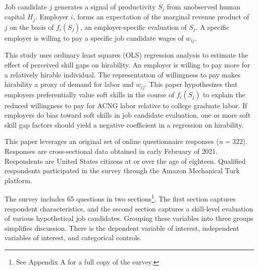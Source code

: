 Job candidate $j$ generates a signal of productivity $S_j$ from unobserved human capital $H_j$.
Employer $i$, forms an expectation of the marginal revenue product of $j$ on the basis of $f_i(S_j)$, an employer-specific evaluation of $S_j$.
A specific employer is willing to pay a specific job candidate wages of $w_{ij}$.

This study uses ordinary least squares (OLS) regression analysis to estimate the effect of perceived skill gaps on hirability.
An employer is willing to pay more for a relatively hirable individual.
The representation of willingness to pay makes hirability a proxy of demand for labor and $w_{ij}$.
%
This paper hypothesizes that employers preferentially value soft skills in the course of $f_i(S_j)$
to explain the reduced willingness to pay for ACNG labor relative to college graduate labor.
If employers do bias toward soft skills in job candidate evaluation,
one or more soft skill gap factors should yield a negative coefficient
in a regression on hirability.

This paper leverages an original set of online questionnaire responses ($n = 322$).
Responses are cross-sectional data obtained in early February of 2021.
Respondents are United States citizens at or over the age of eighteen.
Qualified respondents participated in the survey through the Amazon Mechanical Turk platform.

The survey includes 65 questions in two sections\footnote{See Appendix A for a full copy of the survey.}.
The first section captures respondent characteristics, and the second section captures a skill-level evaluation of various hypothetical job candidates.
Grouping these variables into three groups simplifies discussion.
There is the dependent variable of interest, independent variables of interest, and categorical controls.

